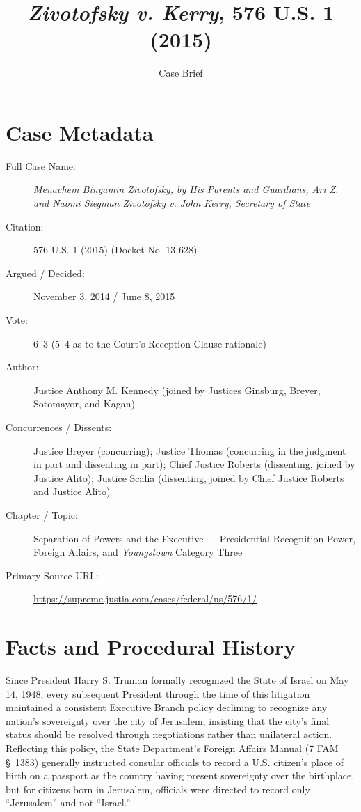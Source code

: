 \documentclass[12pt]{article}
\title{\textit{Zivotofsky v. Kerry}, 576 U.S. 1 (2015)}
\author{Case Brief}
\date{}
\begin{document}
\maketitle

\section{Case Metadata}
\begin{description}
  \item[Full Case Name:] \textit{Menachem Binyamin Zivotofsky, by His Parents and Guardians, Ari Z. and Naomi Siegman Zivotofsky v. John Kerry, Secretary of State}
  \item[Citation:] 576 U.S. 1 (2015) (Docket No. 13-628)
  \item[Argued / Decided:] November 3, 2014 / June 8, 2015
  \item[Vote:] 6--3 (5--4 as to the Court's Reception Clause rationale)
  \item[Author:] Justice Anthony M. Kennedy (joined by Justices Ginsburg, Breyer, Sotomayor, and Kagan)
  \item[Concurrences / Dissents:] Justice Breyer (concurring); Justice Thomas (concurring in the judgment in part and dissenting in part); Chief Justice Roberts (dissenting, joined by Justice Alito); Justice Scalia (dissenting, joined by Chief Justice Roberts and Justice Alito)
  \item[Chapter / Topic:] Separation of Powers and the Executive --- Presidential Recognition Power, Foreign Affairs, and \textit{Youngstown} Category Three
  \item[Primary Source URL:] \url{https://supreme.justia.com/cases/federal/us/576/1/}
\end{description}

\section{Facts and Procedural History}
Since President Harry S. Truman formally recognized the State of Israel on May 14, 1948, every subsequent President through the time of this litigation maintained a consistent Executive Branch policy declining to recognize any nation's sovereignty over the city of Jerusalem, insisting that the city's final status should be resolved through negotiations rather than unilateral action. Reflecting this policy, the State Department's Foreign Affairs Manual (7 FAM \S~1383) generally instructed consular officials to record a U.S. citizen's place of birth on a passport as the country having present sovereignty over the birthplace, but for citizens born in Jerusalem, officials were directed to record only ``Jerusalem'' and not ``Israel.''
\end{document}
